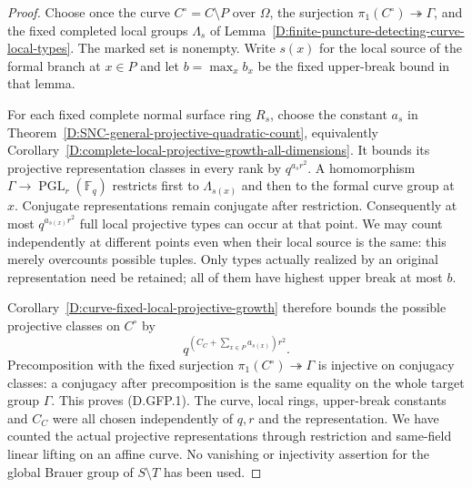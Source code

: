 \begin{proof}
Choose once the curve $C^\circ=C\setminus P$ over $\Omega$,
the surjection $\pi_1(C^\circ)\twoheadrightarrow\Gamma$, and the
fixed completed local groups $\Lambda_s$ of
Lemma~\ref{D:finite-puncture-detecting-curve-local-types}.
The marked set is nonempty. Write $s(x)$ for the local source of
the formal branch at $x\in P$ and let $b=\max_x b_x$ be the
fixed upper-break bound in that lemma.

For each fixed complete normal surface ring $R_s$, choose the
constant $a_s$ in
Theorem~\ref{D:SNC-general-projective-quadratic-count}, equivalently
Corollary~\ref{D:complete-local-projective-growth-all-dimensions}.
It bounds its projective representation classes in every rank by
$q^{a_s r^2}$. A homomorphism
$\Gamma\to\operatorname{PGL}_r(\mathbb F_q)$ restricts first to
$\Lambda_{s(x)}$ and then to the formal curve group at $x$.
Conjugate representations remain conjugate after restriction.
Consequently at most $q^{a_{s(x)}r^2}$ full local projective types
can occur at that point. We may count independently at different
points even when their local source is the same: this merely
overcounts possible tuples. Only types actually realized by an
original representation need be retained; all of them have
highest upper break at most $b$.

Corollary~\ref{D:curve-fixed-local-projective-growth} therefore
bounds the possible projective classes on $C^\circ$ by
\[
                    q^{(C_C+\sum_{x\in P}a_{s(x)})r^2}.
                                                               \tag{D.GFP.2}
\]
Precomposition with the fixed surjection
$\pi_1(C^\circ)\twoheadrightarrow\Gamma$ is injective on
conjugacy classes: a conjugacy after precomposition is the same
equality on the whole target group $\Gamma$. This proves (D.GFP.1).
The curve, local rings, upper-break constants and $C_C$ were all
chosen independently of $q,r$ and the representation.
We have counted the actual projective representations through
restriction and same-field linear lifting on an affine curve.
No vanishing or injectivity assertion for the global Brauer group
of $S\setminus T$ has been used.
\end{proof}

